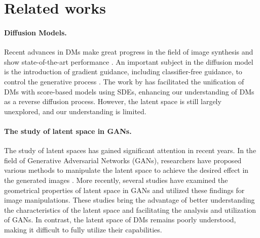 \section{Related works}
\paragraph{Diffusion Models.}
Recent advances in DMs make great progress in the field of image synthesis and show state-of-the-art performance \cite{sohl2015deep, ho2020denoising, song2020denoising}. 
An important subject in the diffusion model is the introduction of gradient guidance, including classifier-free guidance, to control the generative process \cite{dhariwal2021diffusion,sehwag2022generating,avrahami2022blended,liu2021more,nichol2021glide,rombach2022high}. 
The work by \citet{song2020score} has facilitated the unification of DMs with score-based models using SDEs, enhancing our understanding of DMs as a reverse diffusion process.
However, the latent space is still largely unexplored, and our understanding is limited.

\paragraph{The study of latent space in GANs.} The study of latent spaces has gained significant attention in recent years. In the field of Generative Adversarial Networks (GANs), researchers have proposed various methods to manipulate the latent space to achieve the desired effect in the generated images \cite{ramesh2018spectral,patashnik2021styleclip,abdal2021styleflow, harkonen2020ganspace,shen2021closed,yuksel2021latentclr, pan2023drag}.
More recently, several studies \cite{zhu2021low, choi2021not} have examined the geometrical properties of latent space in GANs and utilized these findings for image manipulations. These studies bring the advantage of better understanding the characteristics of the latent space and facilitating the analysis and utilization of GANs. In contrast, the latent space of DMs remains poorly understood, making it difficult to fully utilize their capabilities.

